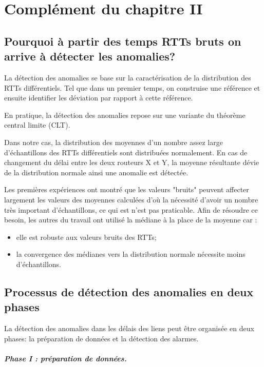 
\chapter{Complément du chapitre II}
\section{Pourquoi à partir des temps RTTs bruts on arrive à détecter les anomalies?}


La détection des anomalies se base sur la caractérisation de la distribution des RTTs différentiels. Tel que dans un premier temps, on construise une référence et ensuite identifier les déviation par rapport à cette référence.


En pratique, la détection des anomalies repose sur une variante du théorème central limite (CLT).

Dans notre cas, la distribution des moyennes d'un nombre assez large d'échantillons des RTTs différentiels sont distribuées normalement. En cas de changement du délai entre les deux routeurs X et Y, la moyenne résultante dévie de la distribution normale ainsi une anomalie est détectée.


Les premières expériences ont montré que les valeurs "bruits" peuvent affecter largement les valeurs des moyennes calculées d'où la nécessité d'avoir un nombre très important d'échantillons, ce qui est n'est pas praticable. Afin de résoudre ce besoin, les autres du travail ont utilisé la médiane à la place de la moyenne car :

\begin{itemize}
	\item elle est robuste aux valeurs bruits des RTTs;
	\item la convergence des médianes vers la distribution normale nécessite moins d'échantillons. 
\end{itemize}

\newpage
 \section{Processus de détection des anomalies en deux phases} \label{processus-de-detection}
 La détection des anomalies dans les délais des liens peut être organisée en deux phases: la préparation de données et la détection des alarmes.
 \paragraph{Phase I : préparation de données.}

